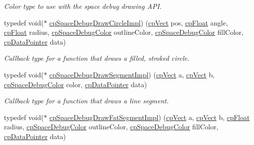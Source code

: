 \begin{DoxyCompactItemize}
\begin{DoxyCompactList}\small\item\em Color type to use with the space debug drawing A\+P\+I. \end{DoxyCompactList}\item 
\hypertarget{group__cp_space_gab96ab3199114538fa70cb5f7c6b2887a}{}typedef void($\ast$ \hyperlink{group__cp_space_gab96ab3199114538fa70cb5f7c6b2887a}{cp\+Space\+Debug\+Draw\+Circle\+Impl}) (\hyperlink{structcp_vect}{cp\+Vect} pos, \hyperlink{group__basic_types_gac1ed65573e035bf892505768c852d8d3}{cp\+Float} angle, \hyperlink{group__basic_types_gac1ed65573e035bf892505768c852d8d3}{cp\+Float} radius, \hyperlink{structcp_space_debug_color}{cp\+Space\+Debug\+Color} outline\+Color, \hyperlink{structcp_space_debug_color}{cp\+Space\+Debug\+Color} fill\+Color, \hyperlink{group__basic_types_ga2ac2c3c31e21893941f9e4f8ee279447}{cp\+Data\+Pointer} data)\label{group__cp_space_gab96ab3199114538fa70cb5f7c6b2887a}

\begin{DoxyCompactList}\small\item\em Callback type for a function that draws a filled, stroked circle. \end{DoxyCompactList}\item 
\hypertarget{group__cp_space_gaed387c6356be81f3da4050547fe47c9e}{}typedef void($\ast$ \hyperlink{group__cp_space_gaed387c6356be81f3da4050547fe47c9e}{cp\+Space\+Debug\+Draw\+Segment\+Impl}) (\hyperlink{structcp_vect}{cp\+Vect} a, \hyperlink{structcp_vect}{cp\+Vect} b, \hyperlink{structcp_space_debug_color}{cp\+Space\+Debug\+Color} color, \hyperlink{group__basic_types_ga2ac2c3c31e21893941f9e4f8ee279447}{cp\+Data\+Pointer} data)\label{group__cp_space_gaed387c6356be81f3da4050547fe47c9e}

\begin{DoxyCompactList}\small\item\em Callback type for a function that draws a line segment. \end{DoxyCompactList}\item 
\hypertarget{group__cp_space_gab8b2b1f7036daa38914a0d3c2cb1d732}{}typedef void($\ast$ \hyperlink{group__cp_space_gab8b2b1f7036daa38914a0d3c2cb1d732}{cp\+Space\+Debug\+Draw\+Fat\+Segment\+Impl}) (\hyperlink{structcp_vect}{cp\+Vect} a, \hyperlink{structcp_vect}{cp\+Vect} b, \hyperlink{group__basic_types_gac1ed65573e035bf892505768c852d8d3}{cp\+Float} radius, \hyperlink{structcp_space_debug_color}{cp\+Space\+Debug\+Color} outline\+Color, \hyperlink{structcp_space_debug_color}{cp\+Space\+Debug\+Color} fill\+Color, \hyperlink{group__basic_types_ga2ac2c3c31e21893941f9e4f8ee279447}{cp\+Data\+Pointer} data)\label{group__cp_space_gab8b2b1f7036daa38914a0d3c2cb1d732}


\end{DoxyCompactItemize}
